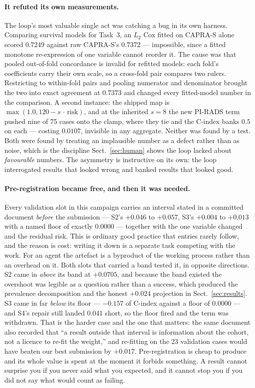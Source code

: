 \paragraph{It refuted its own measurements.}
The loop's most valuable single act was catching a bug in its own harness. Comparing
survival models for Task~3, an $L_2$ Cox fitted on CAPRA-S alone scored $0.7249$
against raw CAPRA-S's $0.7372$ --- impossible, since a fitted monotone re-expression
of one variable cannot reorder it. The cause was that pooled out-of-fold
concordance is invalid for refitted models: each fold's coefficients carry their own
scale, so a cross-fold pair compares two rulers. Restricting to within-fold pairs and
pooling numerator and denominator brought the two into exact agreement at $0.7373$
and changed every fitted-model number in the comparison. A second instance: the
shipped map is $\max(1.0, 120 - s\,\cdot\,\text{risk})$, and at the inherited
$s = 8$ the new PI-RADS term pushed nine of 75 cases onto the clamp, where they tie
and the C-index banks $0.5$ on each --- costing $0.0107$, invisible in any aggregate.
Neither was found by a test. Both were found by treating an implausible number as a
defect rather than as noise, which is the discipline Sect.~\ref{sec:human} shows the
loop lacked about \emph{favourable} numbers. The asymmetry is instructive on its own:
the loop interrogated results that looked wrong and banked results that looked good.

\paragraph{Pre-registration became free, and then it was needed.}
Every validation slot in this campaign carries an interval stated in a committed
document \emph{before} the submission --- S2's $+0.046$ to $+0.057$, S3's $+0.004$ to
$+0.013$ with a named floor of exactly $0.0000$ --- together with the one variable
changed and the residual risk. This is ordinary good practice that entries rarely
follow, and the reason is cost: writing it down is a separate task competing with the
work. For an agent the artefact is a byproduct of the working process rather than an
overhead on it. Both slots that carried a band tested it, in opposite directions. S2
came in \emph{above} its band at $+0.0705$, and because the band existed the overshoot
was legible as a question rather than a success, which produced the prevalence
decomposition and the honest $+0.024$ projection in Sect.~\ref{sec:results}. S3 came
in far \emph{below} its floor --- $-0.157$ of C-index against a floor of $0.0000$ ---
and S4's repair still landed $0.041$ short, so the floor fired and the term was
withdrawn. That is the harder case and the one that matters: the same document also
recorded that ``a result outside that interval is information about the cohort, not a
licence to re-fit the weight,'' and re-fitting on the 23 validation cases would have
beaten our best submission by $+0.017$. Pre-registration is cheap to produce and its
whole value is spent at the moment it forbids something. A result cannot surprise you
if you never said what you expected, and it cannot stop you if you did not say what
would count as failing.

